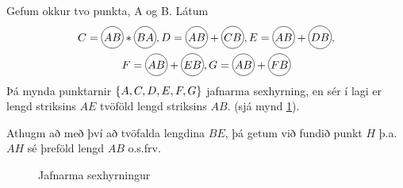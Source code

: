 \begin{frame}
  \begin{hfsmid} \label{hfsmid:tvofoldunlengdar}
    Gefum okkur tvo punkta, A og B. Látum
     \begin{gather*}
       C = \hri{AB}*\hri{BA}, D = \hri{AB}+\hri{CB}, E = \hri{AB}+\hri{DB},\\
       F = \hri{AB}+\hri{EB}, G = \hri{AB}+\hri{FB}
     \end{gather*}
     Þá mynda punktarnir \(\{A,C,D,E,F,G\}\) jafnarma sexhyrning, en sér
     í lagi er lengd striksins \(AE\) tvöföld lengd striksins
     \(AB\). (sjá mynd \ref{fig:jafnarmasexhyrningur}).

     Athugm að með því að tvöfalda lengdina \(BE\),  þá getum við fundið punkt
     \(H\) þ.a. \(AH\) sé þreföld lengd \(AB\) o.s.frv.
   \end{hfsmid}
\end{frame}
   \begin{frame}
     \begin{figure}[H]
       \centering
        \ifglaerur
        
        \else
        
        \fi
       \caption{Jafnarma sexhyrningur}
       \label{fig:jafnarmasexhyrningur}
     \end{figure}
   \end{frame}

